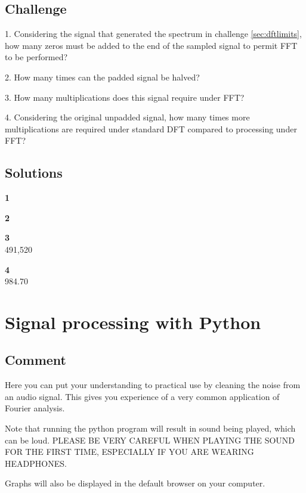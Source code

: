 \subsection*{Challenge}
1. Considering the signal that generated the spectrum in challenge \ref{sec:dftlimits}, how many zeros must be added to the end of the sampled signal to permit FFT to be performed?

2. How many times can the padded signal be halved?

3. How many multiplications does this signal require under FFT?

4. Considering the original unpadded signal, how many times more multiplications are required under standard DFT compared to processing under FFT?

\subsection*{Solutions}
\textbf{1}\\

\textbf{2}\\

\textbf{3}\\
491,520

\textbf{4}\\
984.70



\iffalse
\newpage
\section{Signal processing with Python}

\subsection*{Comment}
Here you can put your understanding to practical use by cleaning the noise from an audio signal. This gives you experience of a very common application of Fourier analysis.

Note that running the python program will result in sound being played, which can be loud. PLEASE BE VERY CAREFUL WHEN PLAYING THE SOUND FOR THE FIRST TIME, ESPECIALLY IF YOU ARE WEARING HEADPHONES.

Graphs will also be displayed in the default browser on your computer.

